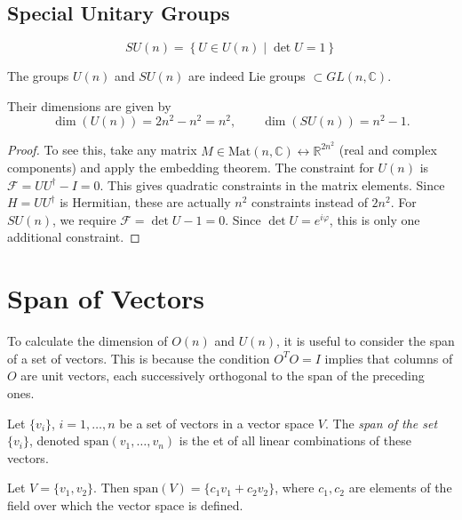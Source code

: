 \subsection{Special Unitary Groups}%
\label{sub:special_unitary_groups}

\begin{equation}
  SU(n) = \left\{ U \in U(n) \mid \det U = 1 \right\}
\end{equation}

The groups $U(n)$ and $SU(n)$ are indeed Lie groups $\subset GL(n, \mathbb{C})$.
\begin{claim}
  Their dimensions are given by
  \begin{equation}
    \dim(U(n)) = 2n^2 - n^2 = n^2, \qquad \dim(SU(n)) = n^2 -1.
  \end{equation}
\end{claim}
\begin{proof}
  To see this, take any matrix $M \in \text{Mat}(n, \mathbb{C}) \leftrightarrow \mathbb{R}^{2n^2}$ (real and complex components) and apply the embedding theorem.
  The constraint for $U(n)$ is  $\mathcal{F} = U U^{\dagger} - I = 0$. This gives quadratic constraints in the matrix elements. Since $H = U U^{\dagger}$ is Hermitian, these are actually $n^2$ constraints instead of $2n^2$.
  For $SU(n)$, we require $\mathcal{F} = \det U - 1 = 0$. Since $\det U = e^{i\varphi}$, this is only one additional constraint.
\end{proof}

\section*{Span of Vectors}%
\label{sec:span_of_vectors}

To calculate the dimension of $O(n)$ and $U(n)$, it is useful to consider the span of a set of vectors.
This is because the condition $O^T O = I$ implies that columns of $O$ are unit vectors, each successively orthogonal to the span of the preceding ones.
\begin{definition}[span]
  Let $\{v_i\}$, $i = 1, \dots, n$ be a set of vectors in a vector space $V$. The \emph{span of the set} $\{v_i\}$, denoted $\text{span}(v_1, \dots, v_n)$ is the et of all linear combinations of these vectors.
\end{definition}
\begin{example}[]
  Let $V = \{v_1, v_2\}$. Then $\text{span}(V) = \{c_1 v_1 + c_2 v_2\}$, where $c_1, c_2$ are elements of the field over which the vector space is defined.
\end{example}
